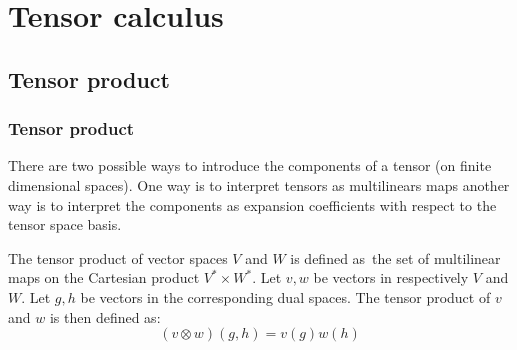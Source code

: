 \chapter{Tensor calculus}

\section{Tensor product}
\subsection{Tensor product}

	There are two possible ways to introduce the components of a tensor (on finite dimensional spaces). One way is to interpret tensors as multilinears maps another way is to interpret the components as expansion coefficients with respect to the tensor space basis.
    
	\begin{definition}\label{tensor:tensor_product}
    		The tensor product of vector spaces $V$ and $W$ is defined as\footnotemark\ the set of multilinear maps on the Cartesian product $V^*\times W^*$. Let $v, w$ be vectors in respectively $V$ and $W$. Let $g, h$ be vectors in the corresponding dual spaces. The tensor product of $v$ and $w$ is then defined as:
        	\begin{equation}
        		\boxed{(v\otimes w)(g, h) = v(g)w(h)}
	        \end{equation}
	\end{definition}
	
    
